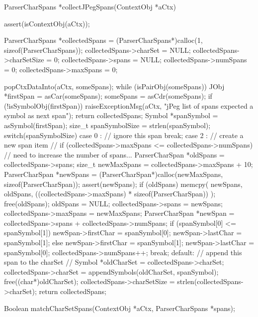 \startCCode
ParserCharSpans *collectJPegSpans(ContextObj *aCtx) {
  assert(isContextObj(aCtx));
  
  ParserCharSpans *collectedSpans = 
    (ParserCharSpans*)calloc(1, sizeof(ParserCharSpans));
  collectedSpans->charSet     = NULL;
  collectedSpans->charSetSize = 0;
  collectedSpans->spans       = NULL;
  collectedSpans->numSpans    = 0;
  collectedSpans->maxSpans    = 0;
  
  popCtxDataInto(aCtx, someSpans);
  while (isPairObj(someSpans)) {
    JObj *firstSpan = asCar(someSpans);
    someSpans       = asCdr(someSpans);
    if (!isSymbolObj(firstSpan)) {
      raiseExceptionMsg(aCtx,
        "jPeg list of spans expected a symbol as next span");
      return collectedSpans; 
    }
    Symbol *spanSymbol     = asSymbol(firstSpan);
    size_t  spanSymbolSize = strlen(spanSymbol);
    switch(spanSymbolSize) {
      case 0 :
        // ignore this span
        break;
      case 2 :
        // create a new span item
        //
        if (collectedSpans->maxSpans <= collectedSpans->numSpans) {
          // need to increase the number of spans...
          ParserCharSpan *oldSpans = collectedSpans->spans;
          size_t newMaxSpans       = collectedSpans->maxSpans + 10;
          ParserCharSpan *newSpans =
            (ParserCharSpan*)calloc(newMaxSpans, sizeof(ParserCharSpan));
          assert(newSpans);
          if (oldSpans) {
            memcpy(
              newSpans,
              oldSpans,
              ((collectedSpans->maxSpans) * sizeof(ParserCharSpan))
            );
            free(oldSpans);
            oldSpans = NULL;
          }
          collectedSpans->spans    = newSpans;
          collectedSpans->maxSpans = newMaxSpans;
        }
        ParserCharSpan *newSpan =
          collectedSpans->spans + collectedSpans->numSpans;
        if (spanSymbol[0] <= spanSymbol[1]) {
          newSpan->firstChar = spanSymbol[0];
          newSpan->lastChar  = spanSymbol[1];
        } else {
          newSpan->firstChar = spanSymbol[1];
          newSpan->lastChar  = spanSymbol[0];
        }
        collectedSpans->numSpans++;
        break;
      default: {
        // append this span to the charSet
        //
        Symbol *oldCharSet = collectedSpans->charSet;
        collectedSpans->charSet =
          appendSymbols(oldCharSet, spanSymbol);
        free((char*)oldCharSet);
        collectedSpans->charSetSize = strlen(collectedSpans->charSet);
      }
    }
  }
  return collectedSpans;
}
\stopCCode

\startCHeader
Boolean matchCharSetSpans(ContextObj *aCtx, ParserCharSpans *spans);
\stopCHeader

